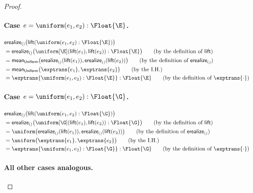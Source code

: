 \begin{proof}
  \paragraph{Case $e=\uniform(e_1,e_2):\Float{\E}$.}
  \begin{align*}
    &\mathsf{erealize}_{()}
    \bigl(
      \mathsf{lift}
      (\uniform(e_1,e_2):\Float{\E})
    \bigr)
    \notag
    \\
    &=
    \mathsf{erealize}_{()}
    \bigl(
      \uniform[\E]
      (\mathsf{lift}(e_1),\mathsf{lift}(e_2))
      :\Float{\E}
    \bigr)
    \tag{by the definition of $\mathsf{lift}$}
    \\
    &=
    \mathsf{mean}_{\mathsf{Uniform}}
    \bigl(
      \mathsf{erealize}_{()}(\mathsf{lift}(e_1)),
      \mathsf{erealize}_{()}(\mathsf{lift}(e_2))
    \bigr)
    \tag{by the definition of $\mathsf{erealize}_{()}$}
    \\
    &=
    \mathsf{mean}_{\mathsf{Uniform}}
    \bigl(\exptrans{e_1},\exptrans{e_2}\bigr)
    \tag{by the I.H.}
    \\
    &=
    \exptrans{\uniform(e_1,e_2):\Float{\E}}:\Float{\E}
    \tag{by the definition of $\exptrans{\cdot}$}
  \end{align*}

  \paragraph{Case $e=\uniform(e_1,e_2):\Float{\G}$.}
  \begin{align*}
    &\mathsf{erealize}_{()}
    \bigl(
      \mathsf{lift}
      (\uniform(e_1,e_2):\Float{\G})
    \bigr)
    \notag
    \\
    &=
    \mathsf{erealize}_{()}
    \bigl(
      \uniform[\G]
      (\mathsf{lift}(e_1),\mathsf{lift}(e_2))
      :\Float{\G}
    \bigr)
    \tag{by the definition of $\mathsf{lift}$}
    \\
    &=
    \uniform\bigl(
      \mathsf{erealize}_{()}(\mathsf{lift}(e_1)),
      \mathsf{erealize}_{()}(\mathsf{lift}(e_2))
    \bigr)
    \tag{by the definition of $\mathsf{erealize}_{()}$}
    \\
    &=
    \uniform\bigl(\exptrans{e_1},\exptrans{e_2}\bigr)
    \tag{by the I.H.}
    \\
    &=
    \exptrans{\uniform(e_1,e_2):\Float{\G}}:\Float{\G}
    \tag{by the definition of $\exptrans{\cdot}$}
  \end{align*}

  \paragraph{All other cases analogous.}
\end{proof}



